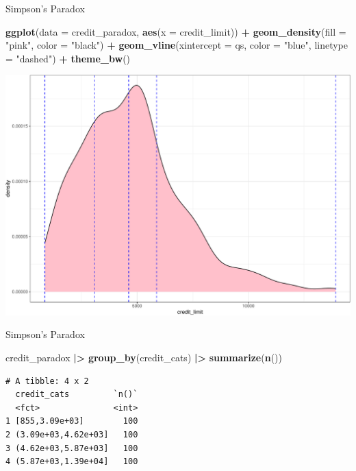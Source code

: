 \documentclass[
  ignorenonframetext,
]{beamer}
\newenvironment{Shaded}{\begin{snugshade}}{\end{snugshade}}
\newcommand{\AttributeTok}[1]{\textcolor[rgb]{0.13,0.29,0.53}{#1}}
\newcommand{\FunctionTok}[1]{\textcolor[rgb]{0.13,0.29,0.53}{\textbf{#1}}}
\newcommand{\NormalTok}[1]{#1}
\newcommand{\SpecialCharTok}[1]{\textcolor[rgb]{0.81,0.36,0.00}{\textbf{#1}}}
\newcommand{\StringTok}[1]{\textcolor[rgb]{0.31,0.60,0.02}{#1}}
\begin{document}
\begin{frame}[fragile]{Simpson's Paradox}
\protect\hypertarget{simpsons-paradox-3}{}
\small

\begin{Shaded}
\begin{Highlighting}[]
\FunctionTok{ggplot}\NormalTok{(}\AttributeTok{data =}\NormalTok{ credit\_paradox, }\FunctionTok{aes}\NormalTok{(}\AttributeTok{x =}\NormalTok{ credit\_limit)) }\SpecialCharTok{+}
  \FunctionTok{geom\_density}\NormalTok{(}\AttributeTok{fill =} \StringTok{"pink"}\NormalTok{, }\AttributeTok{color =} \StringTok{"black"}\NormalTok{) }\SpecialCharTok{+} 
  \FunctionTok{geom\_vline}\NormalTok{(}\AttributeTok{xintercept =}\NormalTok{ qs, }\AttributeTok{color =} \StringTok{"blue"}\NormalTok{, }
             \AttributeTok{linetype =} \StringTok{"dashed"}\NormalTok{) }\SpecialCharTok{+} 
  \FunctionTok{theme\_bw}\NormalTok{()}
\end{Highlighting}
\end{Shaded}

\begin{center}\includegraphics[width=0.8\linewidth,height=0.5\textheight]{Week5_Lect_files/figure-beamer/unnamed-chunk-51-1} \end{center}
\normalsize
\end{frame}

\begin{frame}[fragile]{Simpson's Paradox}
\protect\hypertarget{simpsons-paradox-4}{}
\normalsize

\begin{Shaded}
\begin{Highlighting}[]
\NormalTok{credit\_paradox }\SpecialCharTok{|\textgreater{}} 
  \FunctionTok{group\_by}\NormalTok{(credit\_cats) }\SpecialCharTok{|\textgreater{}} 
  \FunctionTok{summarize}\NormalTok{(}\FunctionTok{n}\NormalTok{())}
\end{Highlighting}
\end{Shaded}

\begin{verbatim}
# A tibble: 4 x 2
  credit_cats         `n()`
  <fct>               <int>
1 [855,3.09e+03]        100
2 (3.09e+03,4.62e+03]   100
3 (4.62e+03,5.87e+03]   100
4 (5.87e+03,1.39e+04]   100
\end{verbatim}

\normalsize
\end{frame}
\end{document}
